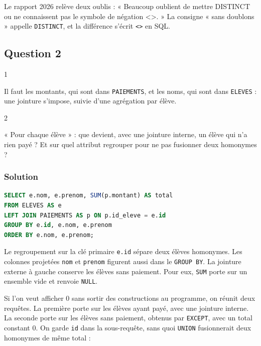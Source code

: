 \documentclass[11pt,a4paper]{article}
\begin{document}
\begin{jury}

Le rapport 2026 relève deux oublis : « Beaucoup oublient de mettre DISTINCT ou ne connaissent pas le symbole de négation \textless\textgreater. » La consigne « sans doublons » appelle \texttt{DISTINCT}, et la différence s'écrit \texttt{\textless{}\textgreater{}} en SQL.

\end{jury}

\hypertarget{question-2}{%
\subsection{Question 2}\label{question-2}}

\begin{indication}{1}

Il faut les montants, qui sont dans \texttt{PAIEMENTS}, et les noms, qui sont dans \texttt{ELEVES} : une jointure s'impose, suivie d'une agrégation par élève.

\end{indication}

\begin{indication}{2}

« Pour chaque élève » : que devient, avec une jointure interne, un élève qui n'a rien payé ? Et sur quel attribut regrouper pour ne pas fusionner deux homonymes ?

\end{indication}

\hypertarget{solution-1}{%
\subsubsection{Solution}\label{solution-1}}

\begin{lstlisting}[language=SQL]
SELECT e.nom, e.prenom, SUM(p.montant) AS total
FROM ELEVES AS e
LEFT JOIN PAIEMENTS AS p ON p.id_eleve = e.id
GROUP BY e.id, e.nom, e.prenom
ORDER BY e.nom, e.prenom;
\end{lstlisting}

Le regroupement sur la clé primaire \texttt{e.id} sépare deux élèves homonymes. Les colonnes projetées \texttt{nom} et \texttt{prenom} figurent aussi dans le \texttt{GROUP\ BY}. La jointure externe à gauche conserve les élèves sans paiement. Pour eux, \texttt{SUM} porte sur un ensemble vide et renvoie \texttt{NULL}.

Si l'on veut afficher 0 sans sortir des constructions au programme, on réunit deux requêtes. La première porte sur les élèves ayant payé, avec une jointure interne. La seconde porte sur les élèves sans paiement, obtenus par \texttt{EXCEPT}, avec un total constant 0. On garde \texttt{id} dans la sous-requête, sans quoi \texttt{UNION} fusionnerait deux homonymes de même total :
\end{document}
